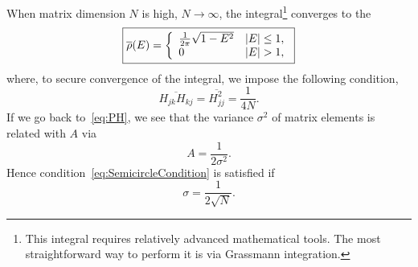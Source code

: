 \documentclass[a4paper,11pt,twoside]{article}
\begin{document}
        When matrix dimension $N$ is high, $N\rightarrow\infty$, the integral\footnote{
            This integral requires relatively advanced mathematical tools.
            The most straightforward way to perform it is via Grassmann integration.
        }
        converges to the ~\cite{Wig57}
        \begin{equation}
            \label{eq:Semicircle}
            \boxed{
                \overline{\rho}(E)=\left\{\begin{array}{ll}
                    \frac{1}{2\pi}\sqrt{1-E^{2}} & \abs{E}\leq 1,\\
                    0 & \abs{E}>1,
                \end{array}
                \right.
            }
        \end{equation}
        where, to secure convergence of the integral, we impose the following condition,
        \begin{equation}
            \label{eq:SemicircleCondition}
            \overline{H_{jk}H_{kj}}=\overline{H_{jj}^{2}}=\frac{1}{4N}.
        \end{equation}
        If we go back to~\eqref{eq:PH}, we see that the variance $\sigma^{2}$ of matrix elements is related with $A$ via
        \begin{equation}
            A=\frac{1}{2\sigma^{2}}.
        \end{equation}
        Hence condition~\eqref{eq:SemicircleCondition} is satisfied if
        \begin{equation}
            \sigma=\frac{1}{2\sqrt{N}}.
        \end{equation}
        
\end{document}

